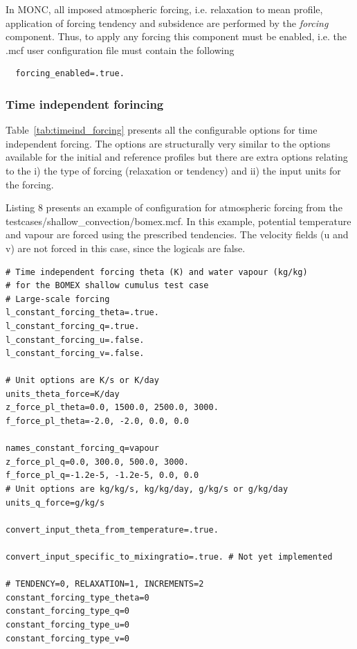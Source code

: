\documentclass[a4paper,11pt]{article}
\begin{document}
In MONC, all imposed atmospheric forcing, i.e. relaxation to mean profile,
application of forcing tendency and subsidence are performed by the \emph{forcing}
component. Thus, to apply any forcing this component must be enabled, i.e. the
.mcf user configuration file must contain the following

\begin{lstlisting}
  forcing_enabled=.true.
\end{lstlisting}

\subsubsection{Time independent forincing}

Table~\ref{tab:timeind_forcing} presents all the configurable options for time independent forcing. The
options are structurally very similar to the options available for the initial and
reference profiles but there are extra options relating to the i) the type of forcing
(relaxation or tendency) and ii) the input units for the forcing.

Listing 8 presents an example of configuration for atmospheric forcing from the
testcases/shallow\_convection/bomex.mcf. In this example, potential temperature and
vapour are forced using the prescribed tendencies. The velocity fields (u and v)
are not forced in this case, since the logicals are false.

\clearpage

\begin{lstlisting}[caption={Example configuration snippet for time independent
    forcing from bomex.mcf}]
# Time independent forcing theta (K) and water vapour (kg/kg)
# for the BOMEX shallow cumulus test case
# Large-scale forcing
l_constant_forcing_theta=.true.
l_constant_forcing_q=.true.
l_constant_forcing_u=.false.
l_constant_forcing_v=.false.

# Unit options are K/s or K/day
units_theta_force=K/day
z_force_pl_theta=0.0, 1500.0, 2500.0, 3000.
f_force_pl_theta=-2.0, -2.0, 0.0, 0.0

names_constant_forcing_q=vapour
z_force_pl_q=0.0, 300.0, 500.0, 3000.
f_force_pl_q=-1.2e-5, -1.2e-5, 0.0, 0.0
# Unit options are kg/kg/s, kg/kg/day, g/kg/s or g/kg/day
units_q_force=g/kg/s

convert_input_theta_from_temperature=.true.

convert_input_specific_to_mixingratio=.true. # Not yet implemented

# TENDENCY=0, RELAXATION=1, INCREMENTS=2
constant_forcing_type_theta=0
constant_forcing_type_q=0
constant_forcing_type_u=0
constant_forcing_type_v=0
\end{lstlisting}
\end{document}
